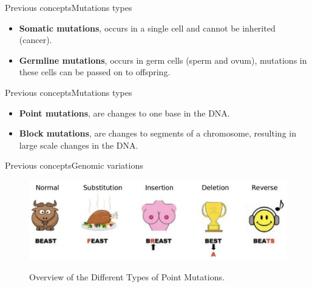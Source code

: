 \documentclass[10pt]{beamer}
\begin{document}
{%
\begin{frame}{Previous concepts}{Mutations types}
	\begin{block}{}
		\begin{itemize}
			\item \textbf{Somatic mutations}, occurs in a single cell and cannot be inherited (cancer).
			\item \textbf{Germline mutations}, occurs in germ cells (sperm and ovum), mutations in these cells can be passed on to offspring.
		\end{itemize}	
	\end{block}
\end{frame}

\begin{frame}{Previous concepts}{Mutations types}
	\begin{block}{}
		\begin{itemize}
			\item \textbf{Point mutations}, are changes to one base in the DNA.
			\item \textbf{Block mutations}, are changes to segments of a chromosome, resulting in large scale changes in the DNA.
		\end{itemize}	
	\end{block}
\end{frame}

\begin{frame}{Previous concepts}{Genomic variations}
	\begin{figure}[]
		\centering
		\includegraphics[width=\textwidth,height=0.7\textheight,keepaspectratio]{img/alignment/point_mutations_med.jpg}
		\label{img:alig}
		\caption{Overview of the Different Types of Point Mutations.}
	\end{figure}
\end{frame}

}
\end{document}
